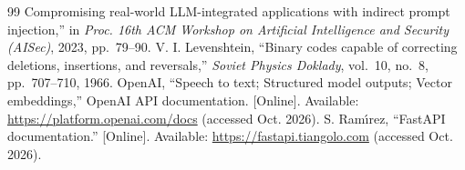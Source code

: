 \documentclass[conference]{IEEEtran}
\begin{document}
\begin{thebibliography}{99}
Compromising real-world LLM-integrated applications with indirect prompt injection,'' in \emph{Proc. 16th ACM Workshop on
Artificial Intelligence and Security (AISec)}, 2023, pp.~79--90.
 V. I. Levenshtein, ``Binary codes capable of correcting deletions, insertions, and reversals,''
\emph{Soviet Physics Doklady}, vol.~10, no.~8, pp.~707--710, 1966.
 OpenAI, ``Speech to text; Structured model outputs; Vector embeddings,'' OpenAI API documentation.
[Online]. Available: \url{https://platform.openai.com/docs} (accessed Oct. 2026).
 S. Ram\'{\i}rez, ``FastAPI documentation.'' [Online]. Available: \url{https://fastapi.tiangolo.com}
(accessed Oct. 2026).
\end{thebibliography}
\end{document}
